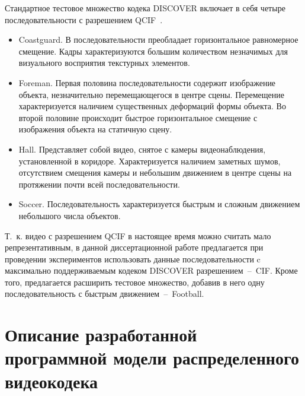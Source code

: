 Стандартное тестовое множество кодека DISCOVER включает в себя четыре последовательности с разрешением QCIF~\cite{5134}.
\begin{itemize}
    \item Coastguard. В последовательности преобладает горизонтальное равномерное смещение. Кадры характеризуются большим количеством незначимых для визуального восприятия текстурных элементов.
    \item Foreman. Первая половина последовательности содержит изображение объекта, незначительно перемещающегося в центре сцены. Перемещение характеризуется наличием существенных деформаций формы объекта. Во второй половине происходит быстрое горизонтальное смещение с изображения объекта на статичную сцену.
    \item Hall. Представляет собой видео, снятое с камеры видеонаблюдения, установленной в коридоре. Характеризуется наличием заметных шумов, отсутствием смещения камеры и небольшим движением в центре сцены на протяжении почти всей последовательности.
    \item Soccer. Последовательность характеризуется быстрым и сложным движением небольшого числа объектов.
\end{itemize}

Т.~к. видео с разрешением QCIF в настоящее время можно считать мало репрезентативным, в данной диссертационной работе предлагается при проведении экспериментов использовать данные последовательности c максимально поддерживаемым кодеком DISCOVER разрешением~--~CIF. Кроме того, предлагается расширить тестовое множество, добавив в него одну последовательность с быстрым движением~--~Football.

\section{Описание разработанной программной модели распределенного видеокодека}
\label{chap:ExpResults:CodecModel}

